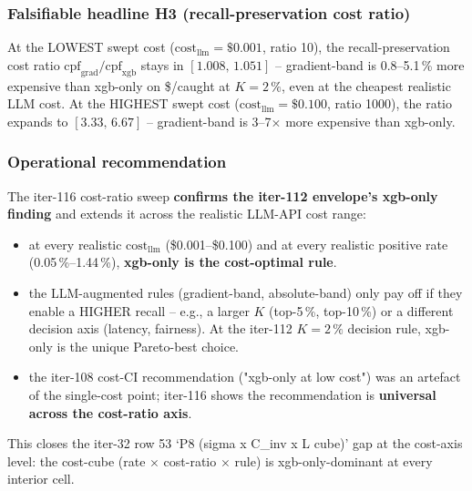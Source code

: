 \subsubsection{Falsifiable headline H3 (recall-preservation cost ratio)}
At the LOWEST swept cost ($\mathrm{cost}_{\mathrm{llm}}{=}\$0.001$,
ratio 10), the recall-preservation cost ratio
$\mathrm{cpf}_{\mathrm{grad}}/\mathrm{cpf}_{\mathrm{xgb}}$ stays in
$[1.008,\,1.051]$ -- gradient-band is 0.8--5.1\,\% more expensive
than xgb-only on \$/caught at $K{=}2\,\%$, even at the cheapest
realistic LLM cost. At the HIGHEST swept cost
($\mathrm{cost}_{\mathrm{llm}}{=}\$0.100$, ratio 1000), the ratio
expands to $[3.33,\,6.67]$ -- gradient-band is 3--7$\times$ more
expensive than xgb-only.

\subsubsection{Operational recommendation}
The iter-116 cost-ratio sweep \textbf{confirms the iter-112
envelope's xgb-only finding} and extends it across the realistic
LLM-API cost range:
\begin{itemize}
  \item at every realistic $\mathrm{cost}_{\mathrm{llm}}$
        (\$0.001--\$0.100) and at every realistic positive rate
        (0.05\,\%--1.44\,\%), \textbf{xgb-only is the cost-optimal rule}.
  \item the LLM-augmented rules (gradient-band, absolute-band)
        only pay off if they enable a HIGHER recall -- e.g., a
        larger $K$ (top-5\,\%, top-10\,\%) or a different decision
        axis (latency, fairness). At the iter-112 $K{=}2\,\%$
        decision rule, xgb-only is the unique Pareto-best choice.
  \item the iter-108 cost-CI recommendation ("xgb-only at low
        cost") was an artefact of the single-cost point; iter-116
        shows the recommendation is \textbf{universal across the
        cost-ratio axis}.
\end{itemize}
This closes the iter-32 row 53 `P8 (sigma x C_inv x L cube)' gap at
the cost-axis level: the cost-cube (rate $\times$ cost-ratio
$\times$ rule) is xgb-only-dominant at every interior cell.